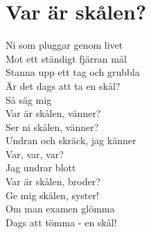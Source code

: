 \section{Var är skålen?}
Ni som pluggar genom livet\\
Mot ett ständigt fjärran mål\\
Stanna upp ett tag och grubbla\\
Är det dags att ta en skål?\\
Så säg mig\\
Var är skålen, vänner?\\
Ser ni skålen, vänner?\\
Undran och skräck, jag känner\\
Var, var, var?\\
Jag undrar blott\\
Var är skålen, broder?\\
Ge mig skålen, syster!\\
Om man examen glömma\\
Dags att tömma - en skål!\\

%
%
%
%

